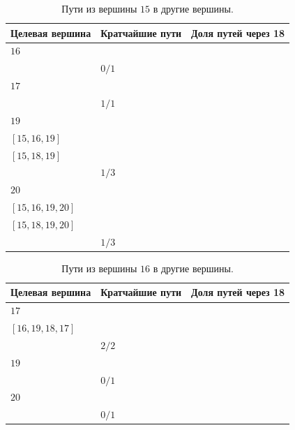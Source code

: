 \documentclass[12pt, a4paper]{extarticle}
\begin{document}
\begin{table}[h!]
    \caption{Пути из вершины $15$ в другие вершины.}
    \label{tbl:10-15}
    \begin{tabularx}{\textwidth}{|X|X|X|}
        \hline 
        Целевая вершина & Кратчайшие пути & Доля путей через 18 \\
        \hline 
        $16$ & \begin{tabular}{@{}l@{}} $[15, 16]$ \\ \end{tabular} & $0/1$ \\
        \hline
        $17$ & \begin{tabular}{@{}l@{}} $[15, 18, 17]$ \\ \end{tabular} & $1/1$ \\
        \hline
        $19$ & \begin{tabular}{@{}l@{}} $[15, 14, 19]$ \\  $[15, 16, 19]$ \\  $[15, 18, 19]$ \\ \end{tabular} & $1/3$ \\
        \hline
        $20$ & \begin{tabular}{@{}l@{}} $[15, 14, 19, 20]$ \\  $[15, 16, 19, 20]$ \\  $[15, 18, 19, 20]$ \\ \end{tabular} & $1/3$ \\
        \hline
    \end{tabularx}
\end{table}
\begin{table}[h!]
    \caption{Пути из вершины $16$ в другие вершины.}
    \label{tbl:10-16}
    \begin{tabularx}{\textwidth}{|X|X|X|}
        \hline 
        Целевая вершина & Кратчайшие пути & Доля путей через 18 \\
        \hline 
        $17$ & \begin{tabular}{@{}l@{}} $[16, 15, 18, 17]$ \\  $[16, 19, 18, 17]$ \\ \end{tabular} & $2/2$ \\
        \hline
        $19$ & \begin{tabular}{@{}l@{}} $[16, 19]$ \\ \end{tabular} & $0/1$ \\
        \hline
        $20$ & \begin{tabular}{@{}l@{}} $[16, 19, 20]$ \\ \end{tabular} & $0/1$ \\
        \hline
    \end{tabularx}
\end{table}
\end{document}
